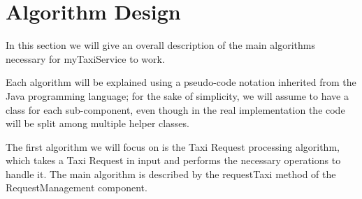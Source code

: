 \chapter{Algorithm Design}
In this section we will give an overall description of the main algorithms necessary for myTaxiService to work. 

Each algorithm will be explained using a pseudo-code notation inherited from the Java programming language; for the sake of simplicity, we will assume to have a class for each sub-component, even though in the real implementation the code will be split among multiple helper classes.

The first algorithm we will focus on is the Taxi Request processing algorithm, which takes a Taxi Request in input and performs the necessary operations to handle it. The main algorithm is described by the requestTaxi method of the RequestManagement component.

